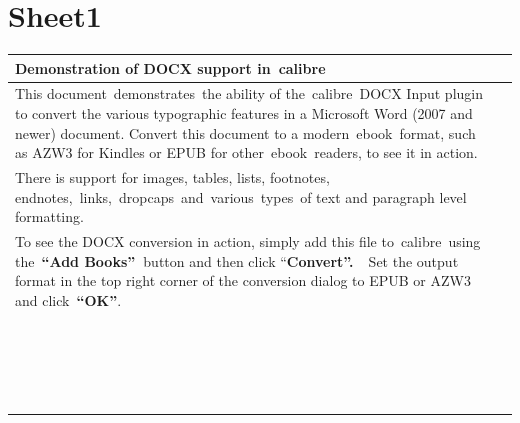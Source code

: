 \documentclass[\officeparserdriver 12pt]{article}
\begin{document}
\section{Sheet1}

\begin{longtable}{|*{2}{>{\raggedright\arraybackslash}p{\dimexpr(\linewidth-4\tabcolsep-3\arrayrulewidth)/2\relax}|}}
\hline
\textcolor{hex17365D}{{\fontsize{26pt}{31.2pt}\selectfont Demonstration of DOCX support in~calibre~}} &  \\
\hline
\textcolor{hex000000}{This document~demonstrates~the ability of the~calibre~DOCX Input plugin to convert the various typographic features in a Microsoft Word (2007 and newer) document. Convert this document to a modern~ebook~format, such as AZW3 for Kindles or EPUB for other~ebook~readers, to see it in action.~} &  \\
\hline
\textcolor{hex000000}{There is support for images, tables, lists, footnotes, endnotes,~links,~dropcaps~and~various~types~of text and paragraph level formatting.~} &  \\
\hline
\textcolor{hex000000}{To see the DOCX conversion in action, simply add this file to~calibre~using the~}\textcolor{hex000000}{\textbf{“Add Books”~}}\textcolor{hex000000}{button and then click “}\textcolor{hex000000}{\textbf{Convert”.~}}\textcolor{hex000000}{~Set the output format in the top right corner of the conversion dialog to EPUB or AZW3 and click~}\textcolor{hex000000}{\textbf{“OK”}}\textcolor{hex000000}{.~} &  \\
\hline
 &  \\
\hline
 &  \\
\hline
 &  \\
\hline
 &  \\
\hline
 &  \\
\hline
 &  \\
\hline
 &  \\
\hline
 &  \\
\hline
 &  \\
\hline
 &  \\
\hline
 &  \\
\hline
 &  \\
\hline
 &  \\
\hline
 &  \\
\hline
 &  \\
\hline
 &  \\
\hline
 &  \\
\hline
 &  \\
\hline
 &  \\

\end{longtable}
\end{document}
